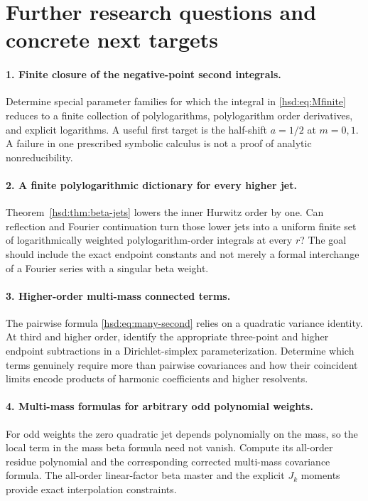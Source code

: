\documentclass[11pt]{article}
\numberwithin{equation}{section}
\theoremstyle{definition}\newtheorem{definition}[theorem]{Definition}
\theoremstyle{remark}\newtheorem{remark}[theorem]{Remark}
\begin{document}
\section{Further research questions and concrete next targets}
\label{hsd:sec:future}
\paragraph{1. Finite closure of the negative-point second integrals.}
Determine special parameter families for which the integral in
\eqref{hsd:eq:Mfinite} reduces to a finite collection of polylogarithms,
polylogarithm order derivatives, and explicit logarithms. A useful first
target is the half-shift $a=1/2$ at $m=0,1$. A failure in one prescribed
symbolic calculus is not a proof of analytic nonreducibility.

\paragraph{2. A finite polylogarithmic dictionary for every higher jet.}
Theorem~\ref{hsd:thm:beta-jets} lowers the inner Hurwitz order by one.
Can reflection and Fourier continuation turn those lower jets into a
uniform finite set of logarithmically weighted polylogarithm-order
integrals at every $r$? The goal should include the exact endpoint
constants and not merely a formal interchange of a Fourier series with
a singular beta weight.

\paragraph{3. Higher-order multi-mass connected terms.}
The pairwise formula \eqref{hsd:eq:many-second} relies on a quadratic
variance identity. At third and higher order, identify the appropriate
three-point and higher endpoint subtractions in a Dirichlet-simplex
parameterization. Determine which terms genuinely require more than
pairwise covariances and how their coincident limits encode products of
harmonic coefficients and higher resolvents.

\paragraph{4. Multi-mass formulas for arbitrary odd polynomial weights.}
For odd weights the zero quadratic jet depends polynomially on the mass,
so the local term in the mass beta formula need not vanish. Compute its
all-order residue polynomial and the corresponding corrected multi-mass
covariance formula. The all-order linear-factor beta master and the
explicit $J_k$ moments provide exact interpolation constraints.
\end{document}

